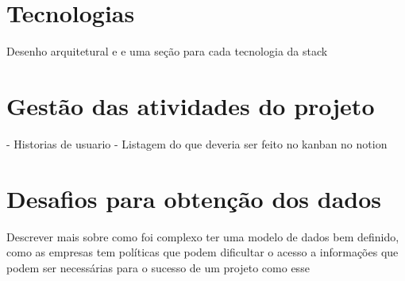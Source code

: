 \section[Tecnologias]{Tecnologias}
Desenho arquitetural e e uma seção para cada tecnologia da stack

\section[Gestão das atividades do projeto]{Gestão das atividades do projeto}
- Historias de usuario
- Listagem do que deveria ser feito no kanban no notion

\section[Desafios para obtenção dos dados]{Desafios para obtenção dos dados}
Descrever mais sobre como foi complexo ter uma modelo de dados bem definido, como as empresas tem políticas que podem dificultar o acesso a informações que podem ser necessárias para o sucesso de um projeto como esse
